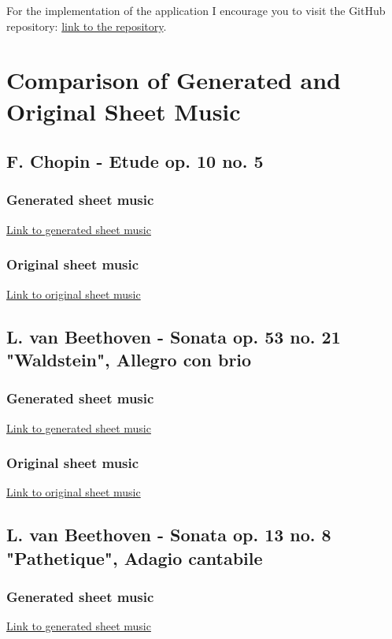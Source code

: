 \documentclass{article}
\begin{document}
For the implementation of the application I encourage you to visit the GitHub repository: \href{https://github.com/mj300405/MP3_to_notes}{link to the repository}.


\clearpage
\FloatBarrier
\section{Comparison of Generated and Original Sheet Music}

\subsection{F. Chopin - Etude op. 10 no. 5}

\subsubsection{Generated sheet music}
\hyperref[fig:generated_chopin]{Link to generated sheet music}

\subsubsection{Original sheet music}
\hyperref[fig:original_chopin]{Link to original sheet music}

\subsection{L. van Beethoven - Sonata op. 53 no. 21 "Waldstein", Allegro con brio}

\subsubsection{Generated sheet music}
\hyperref[fig:generated_waldstein]{Link to generated sheet music}

\subsubsection{Original sheet music}
\hyperref[fig:original_waldstein]{Link to original sheet music}

\subsection{L. van Beethoven - Sonata op. 13 no. 8 "Pathetique", Adagio cantabile}

\subsubsection{Generated sheet music}
\hyperref[fig:generated_pathetique]{Link to generated sheet music}
\end{document}
